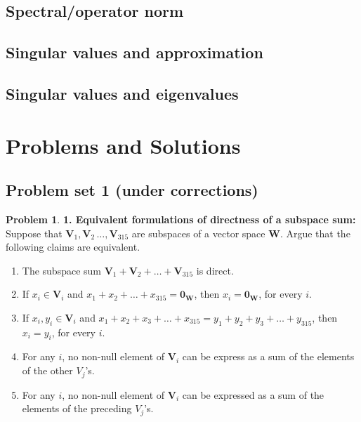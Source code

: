 \documentclass{article}
\theoremstyle{definition}
\newtheorem*{prob*}{Problem}
\newcommand{\V}{\mathbf{V}}
\newcommand{\W}{\mathbf{W}}
\begin{document}
\subsection{Spectral/operator norm}
\subsection{Singular values and approximation}
\subsection{Singular values and eigenvalues}







































\newpage
\section{Problems and Solutions}
\subsection{Problem set 1 (under corrections)}
\begin{prob*} \textbf{1. Equivalent formulations of directness of a subspace sum:} Suppose that $\V_1, \V_2\,\dots,\V_{315}$ are subspaces of a vector space $\W$. Argue that the following claims are equivalent. 
	\begin{enumerate}
		\item The subspace sum $\V_1 + \V_2 + \dots + \V_{315}$ is direct. 
		\item If $x_i \in \V_i$ and $x_1 + x_2 + \dots + x_{315} = \mathbf{0}_\W$, then $x_i = \mathbf{0}_\W$, for every $i$.
		\item If $x_i, y_i \in \V_i$ and $x_1 + x_2 + x_3 + \dots + x_{315} = y_1 + y_2 + y_3 + \dots + y_{315}$, then $x_i = y_i$, for every $i$.
		\item For any $i$, no non-null element of $\V_i$ can be express as a sum of the elements of the other $V_j$'s.
		\item For any $i$, no non-null element of $\V_i$ can be expressed as a sum of the elements of the preceding $V_j$'s. 
	\end{enumerate}

\end{prob*}
\end{document}
